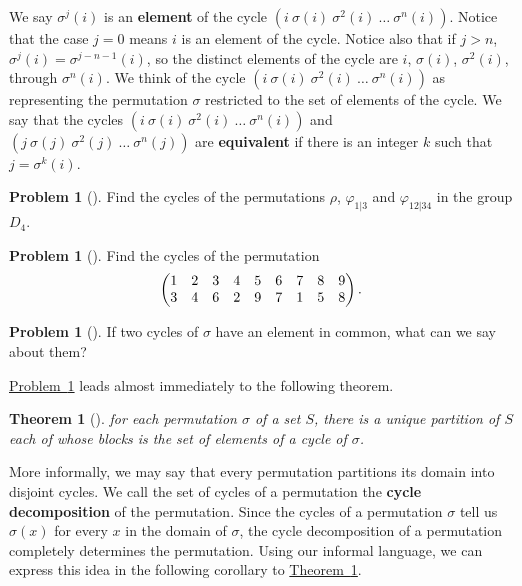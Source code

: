 \documentclass[10pt,]{book}
\newcommand{\terminology}[1]{\textbf{#1}}
\theoremstyle{plain}
\newtheorem{theorem}{Theorem}[section]
\theoremstyle{definition}
\newtheorem{activity}[project]{Problem}
\theoremstyle{definition}
\numberwithin{equation}{chapter}
\newcommand{\gt}{>}
\newcommand{\amp}{&}
\begin{document}
\hypertarget{p-1554}{}%
We say \(\sigma^j(i)\) is an \terminology{element} of the cycle \((i\ \sigma(i)\ \sigma^2(i)\ \ldots\ \sigma^n(i))\).  Notice that the case \(j=0\) means \(i\) is an element of the cycle.  Notice also that if \(j\gt n\), \(\sigma^j(i) = \sigma^{j-n-1}(i)\), so the distinct elements of the cycle are \(i\), \(\sigma(i)\), \(\sigma^2(i)\), through \(\sigma^n(i)\). We think of the cycle \((i\ \sigma(i)\ \sigma^2(i)\ \ldots\ \sigma^n(i))\) as representing the permutation \(\sigma\) restricted to the set of elements of the cycle. We say that the cycles \((i\
\sigma(i)\
\sigma^2(i)\ \ldots\ \sigma^n(i))\) and \((j\
\sigma(j)\
\sigma^2(j)\ \ldots\ \sigma^n(j))\) are \terminology{equivalent} if there is an integer \(k\) such that \(j=
\sigma^k(i)\).%
\begin{activity}[] \label{d4-cycles}
\hypertarget{p-1555}{}%
Find the cycles of the permutations \(\rho\), \(\varphi_{1|3}\) and \(\varphi_{12|34}\) in the group \(D_4\).%
\end{activity}
\begin{activity}[]\marginsymbol[-1em]{} \label{permutation-cycles}
\hypertarget{p-1557}{}%
Find the cycles of the permutation%
\begin{equation*}
\begin{pmatrix}1\amp 2\amp 3\amp 4\amp 5\amp 6\amp 7\amp 8\amp 9\cr
3\amp 4\amp 6\amp 2\amp 9\amp 7\amp 1\amp 5\amp 8
\end{pmatrix}\text{.}
\end{equation*}
%
\end{activity}
\begin{activity}[]\marginsymbol[-1em]{} \label{common-elements}
\hypertarget{p-1559}{}%
If two cycles of \(\sigma\) have an element in common, what can we say about them?%
\end{activity}
\hypertarget{p-1561}{}%
\hyperref[common-elements]{Problem~\ref{common-elements}} leads almost immediately to the following theorem.%
\begin{theorem}[{}]\label{unique-partition}
\hypertarget{p-1562}{}%
for each permutation \(\sigma\) of a set \(S\), there is a unique partition of \(S\) each of whose blocks is the set of elements of a cycle of \(\sigma\).%
\end{theorem}
\hypertarget{p-1563}{}%
More informally, we may say that every permutation partitions its domain into disjoint cycles. We call the set of cycles of a permutation the \terminology{cycle decomposition} of the permutation. Since the cycles of a permutation \(\sigma\) tell us \(\sigma(x)\) for every \(x\) in the domain of \(\sigma\), the cycle decomposition of a permutation completely determines the permutation. Using our informal language, we can express this idea in the following corollary to \hyperref[unique-partition]{Theorem~\ref{unique-partition}}.%
\end{document}
